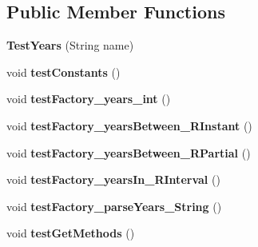 \subsection*{Public Member Functions}
\begin{DoxyCompactItemize}
\item 
\hypertarget{classorg_1_1joda_1_1time_1_1_test_years_ade0bced4c3013d3e16922b41821e2d11}{{\bfseries Test\-Years} (String name)}\label{classorg_1_1joda_1_1time_1_1_test_years_ade0bced4c3013d3e16922b41821e2d11}

\item 
\hypertarget{classorg_1_1joda_1_1time_1_1_test_years_ad3ce6dd6afaddce54f1b9efe9c98ad0e}{void {\bfseries test\-Constants} ()}\label{classorg_1_1joda_1_1time_1_1_test_years_ad3ce6dd6afaddce54f1b9efe9c98ad0e}

\item 
\hypertarget{classorg_1_1joda_1_1time_1_1_test_years_a2059b46e746057820d4c1f95a9fe2457}{void {\bfseries test\-Factory\-\_\-years\-\_\-int} ()}\label{classorg_1_1joda_1_1time_1_1_test_years_a2059b46e746057820d4c1f95a9fe2457}

\item 
\hypertarget{classorg_1_1joda_1_1time_1_1_test_years_aea000bcdfa87e0f33294fc801804ad01}{void {\bfseries test\-Factory\-\_\-years\-Between\-\_\-\-R\-Instant} ()}\label{classorg_1_1joda_1_1time_1_1_test_years_aea000bcdfa87e0f33294fc801804ad01}

\item 
\hypertarget{classorg_1_1joda_1_1time_1_1_test_years_a580f08bbe4c0a56aaaa9ce573cd8587b}{void {\bfseries test\-Factory\-\_\-years\-Between\-\_\-\-R\-Partial} ()}\label{classorg_1_1joda_1_1time_1_1_test_years_a580f08bbe4c0a56aaaa9ce573cd8587b}

\item 
\hypertarget{classorg_1_1joda_1_1time_1_1_test_years_a0c01a09836a7d402251a94a4328409a4}{void {\bfseries test\-Factory\-\_\-years\-In\-\_\-\-R\-Interval} ()}\label{classorg_1_1joda_1_1time_1_1_test_years_a0c01a09836a7d402251a94a4328409a4}

\item 
\hypertarget{classorg_1_1joda_1_1time_1_1_test_years_a4e162967d66eb94f1533fee8a90b23cf}{void {\bfseries test\-Factory\-\_\-parse\-Years\-\_\-\-String} ()}\label{classorg_1_1joda_1_1time_1_1_test_years_a4e162967d66eb94f1533fee8a90b23cf}

\item 
\hypertarget{classorg_1_1joda_1_1time_1_1_test_years_a92b9157283484abf30756d6b02fb5c8b}{void {\bfseries test\-Get\-Methods} ()}\label{classorg_1_1joda_1_1time_1_1_test_years_a92b9157283484abf30756d6b02fb5c8b}


\end{DoxyCompactItemize}
